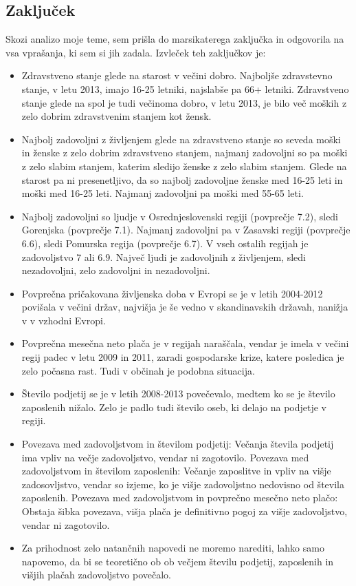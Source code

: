 \documentclass[11pt,a4paper]{article}
\begin{document}
\subsection{Zaključek}
Skozi analizo moje teme, sem prišla do marsikaterega zaključka in odgovorila na vsa vprašanja, ki sem si jih zadala. Izvleček teh zaključkov je:
\begin{itemize}
\item Zdravstveno stanje glede na starost v večini dobro. Najboljše zdravstevno stanje, v letu 2013,  imajo 16-25 letniki, najslabše pa 66+ letniki. Zdravstveno stanje glede na spol je tudi večinoma dobro, v letu 2013, je bilo več moških z zelo dobrim zdravstvenim stanjem kot žensk.
\item Najbolj zadovoljni z življenjem glede na zdravstveno stanje so seveda moški in ženske z zelo dobrim zdravstveno stanjem, najmanj zadovoljni so pa moški z zelo slabim stanjem, katerim sledijo ženske z zelo slabim stanjem. Glede na starost pa ni presenetljivo, da so najbolj zadovoljne ženske med 16-25 leti in moški med 16-25 leti. Najmanj zadovoljni pa moški med 55-65 leti.
\item Najbolj zadovoljni so ljudje v Osrednjeslovenski regiji (povprečje 7.2), sledi Gorenjska (povprečje 7.1). Najmanj zadovoljni pa v Zasavski regiji (povprečje 6.6), sledi Pomurska regija (povprečje 6.7). V vseh ostalih regijah je zadovoljstvo 7 ali 6.9. Največ ljudi je zadovoljnih z življenjem, sledi nezadovoljni, zelo zadovoljni in nezadovoljni.
\item Povprečna pričakovana življenska doba v Evropi se je v letih 2004-2012 povišala v večini držav, najvišja je še vedno v skandinavskih državah, nanižja v v vzhodni Evropi.
\item Povprečna mesečna neto plača je v regijah naraščala, vendar je imela v večini regij padec v letu 2009 in 2011, zaradi gospodarske krize, katere posledica je zelo počasna rast. Tudi v občinah je podobna situacija.
\item Število podjetij se je v letih 2008-2013 povečevalo, medtem ko se je število zaposlenih nižalo. Zelo je padlo tudi število oseb, ki delajo na podjetje v regiji. 
\item Povezava med zadovoljstvom in številom podjetij: Večanja števila podjetij ima vpliv na večje zadovoljstvo, vendar ni zagotovilo. Povezava med zadovoljstvom in številom zaposlenih: Večanje zaposlitve in vpliv na višje zadosovljstvo, vendar so izjeme, ko je višje zadovoljstno nedovisno od števila zaposlenih. Povezava med zadovoljstvom in povprečno mesečno neto plačo: Obstaja šibka povezava, višja plača je definitivno pogoj za višje zadovoljstvo, vendar ni zagotovilo.
\item Za prihodnost zelo natančnih napovedi ne moremo narediti, lahko samo napovemo, da bi se teoretično ob ob večjem številu podjetij, zaposlenih in višjih plačah zadovoljstvo povečalo.
\end{itemize}
\end{document}
